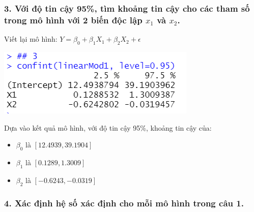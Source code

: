 \documentclass[a4paper]{article}
\theoremstyle{nonumberplain}
\begin{document}
\subsubsection*{3. Với độ tin cậy 95\%, tìm khoảng tin cậy cho các tham số trong mô hình với 2 biến độc lập $x_1$ và $x_2$.}
Viết lại mô hình: $Y = \beta_0 + \beta_1 X_1 + \beta_2 X_2 + \epsilon$

\begin{center}
\includegraphics{bai3_3.PNG} 
\end{center}

Dựa vào kết quả mô hình, với độ tin cậy 95\%, khoảng tin cậy của:

\begin{itemize}
    \item $\beta_0$ là $[12.4939, 39.1904]$
    \item $\beta_1$ là $[0.1289, 1.3009]$
    \item $\beta_2$ là $[-0.6243, -0.0319]$
\end{itemize}

\subsubsection*{4. Xác định hệ số xác định cho mỗi mô hình trong câu 1.}
\end{document}

